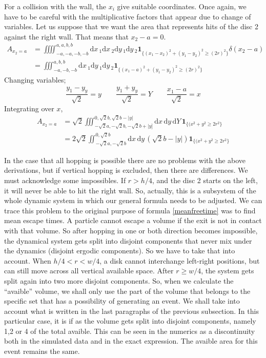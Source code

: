 \documentclass[superscriptaddress,pre,reprint,showpacs,onecolumn]{revtex4-1}
\newcommand{\rd}[1]{\mathrm{d}{#1} \,}
\newcommand{\indicatorsymbol}{\mathbf{1}}
\newcommand{\indicator}[1]{\indicatorsymbol_{ \{   #1 \} } }
\begin{document}
    For a collision with the wall, the $x_i$ give suitable coordinates. Once again, we
    have to be careful with the multiplicative factors that appear due to change
    of variables. Let us suppose that we want the area that represents hits of
    the disc 2 against the right wall. That means that $x_2-a=0$. 
    \begin{align}
      A_{x_2=a} & =\iiiint_{-a,-a,-b,-b}^{a,a,b,b} \rd x_1 \rd x_2 \rd y_1 \rd y_2 
      \indicator{(x_1-x_2)^2+(y_1-y_2)^2 \geq (2 r)^2} \delta (x_2-a)\\
      &=\iiint_{-a,-b,-b}^{a,b,b} \rd x_1  \rd y_1 \rd y_2 
      \indicator{(x_1-a)^2+(y_1-y_2)^2 \geq (2 r)^2} 
    \end{align}
    Changing variables;
    \begin{equation}
      \frac{y_1-y_y}{\sqrt{2}} =  y  \qquad \frac{y_1+y_y}{\sqrt{2}}=Y \qquad \frac{x_1-a}{\sqrt{2}}=x
    \end{equation}
    Integrating over $x$,
    \begin{align}\label{areachoquexy}
      A_{x_2=a} & =\sqrt{2}\iiint_{-\sqrt{2}a,-\sqrt{2}b,-\sqrt{2}b+|y]}^{0,\sqrt{2}b,\sqrt{2}b-|y|}
        \rd x \rd y \rd Y 
      \indicator{(x^2+y^2 \geq 2 r^2} \\
      &=2\sqrt{2}\iint_{-\sqrt{2}a,-\sqrt{2}b}^{0,\sqrt{2}b}
        \rd x \rd y (\sqrt{2} b - |y|)
      \indicator{(x^2+y^2 \geq 2 r^2}
    \end{align}
    
    
    In the case that all hopping is possible there are no problems with
    the above derivations,
    but if vertical hopping is excluded, then there are differences.
    We must acknowledge some impossibles. If $r>h/4$, and the disc 2 starts
    on the left, it will never be able to hit the right wall. So, actually, this
    is a subsystem of the whole dynamic system in which our general formula needs
    to be adjusted. We can trace this problem to the original purpose of
    formula \ref{meanfreetime}
    was to find mean escape times. A particle cannot escape a volume if the exit is
    not in contact with that volume. So after hopping in one or both direction
    becomes impossible, the dynamical system gets split into disjoint components
    that never mix under the dynamics (disjoint ergodic components).
    So we have to take that
    into account. When $h/4<r<w/4$, a disk cannot interchange left-right positions,
    but can still move across all vertical available space.  After $r\geq w/4$,
    the system gets split again into two more disjoint components.
    So, when we calculate the ``avaible'' volume, we shall only use the
    part of the volume that belongs to the specific set that has a possibility of
    generating an event. We shall take into account what is written in the last
    paragraphs of the previous subsection. In this particular case, it is
    if as the volume gets split into disjoint components, namely 1,2 or 4 of the
    total avaible. This can be seen in the numerics as a discontinuity both
    in  the simulated data and in the exact expression. The avaible area
    for this event remains the same. 
    
\end{document}
